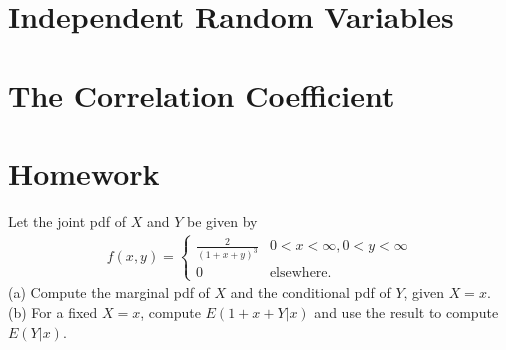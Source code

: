 \section{Independent Random Variables}

\section{The Correlation Coefficient}

\section{Homework}

\begin{exercise}{}{}
    Let the joint pdf of $X$ and $Y$ be given by
    \begin{align*}
        f(x,y) = \left\{\begin{matrix}
            \frac{2}{(1+x+y)^3} & 0<x<\infty, 0<y<\infty\\
            0 & \text{elsewhere}.
           \end{matrix}\right.
    \end{align*}
    (a) Compute the marginal pdf of $X$ and the conditional pdf of $Y$, given $X=x$.\\
    (b) For a fixed $X=x$, compute $E(1+x+Y|x)$ and use the result to compute $E(Y|x)$.
\end{exercise}

